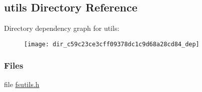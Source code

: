 \subsection{utils Directory Reference}
\label{dir_c59c23ce3cff09378dc1c9d68a28cd84}
Directory dependency graph for utils\+:
\nopagebreak
\begin{figure}[H]
\begin{center}
\leavevmode
\texttt{[image: dir\_c59c23ce3cff09378dc1c9d68a28cd84\_dep]}
\end{center}
\end{figure}
\subsubsection*{Files}
\begin{DoxyCompactItemize}
\item 
file \hyperlink{fsutils_8h}{fsutils.\+h}
\end{DoxyCompactItemize}
